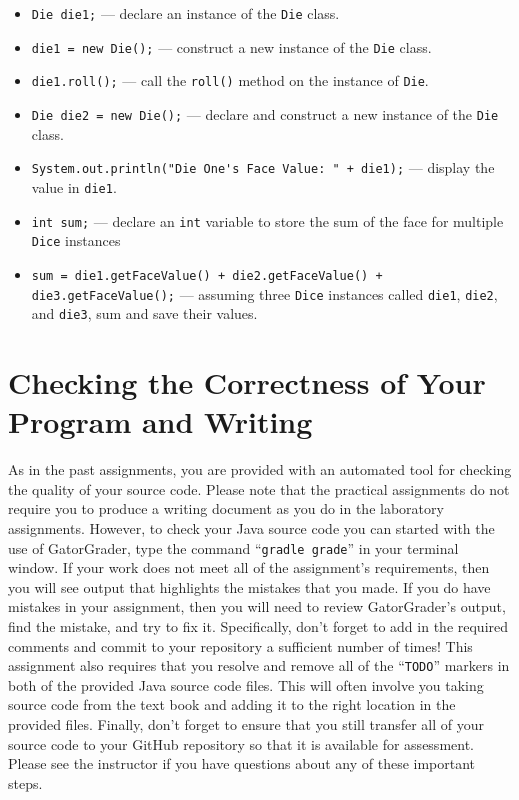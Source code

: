 \documentclass[11pt]{article}
\newcommand{\gatorgraderstart}{\command{gradle grade}}
\newcommand{\command}[1]{``\lstinline{#1}''}
\newcommand{\program}[1]{\lstinline{#1}}
\begin{document}
\begin{itemize}

  \item \program{Die die1;} --- declare an instance of the \program{Die} class.

  \item \program{die1 = new Die();} --- construct a new instance of the \program{Die} class.

  \item \program{die1.roll();} --- call the \program{roll()} method on the
    instance of \program{Die}.

  \item \program{Die die2 = new Die();} --- declare and construct a new instance of the \program{Die} class.

  \item \program{System.out.println("Die One's Face Value: " + die1);} ---
    display the value in \program{die1}.

  \item \program{int sum;} --- declare an \program{int} variable to store the
    sum of the face for multiple \program{Dice} instances

  \item \program{sum = die1.getFaceValue() + die2.getFaceValue() +
    die3.getFaceValue();} --- \newline assuming three \program{Dice} instances
    called \program{die1}, \program{die2}, and \program{die3}, sum and save
    their values.

\end{itemize}

\section*{Checking the Correctness of Your Program and Writing}

As in the past assignments, you are provided with an automated tool for checking
the quality of your source code. Please note that the practical assignments do
not require you to produce a writing document as you do in the laboratory
assignments. However, to check your Java source code you can started with the
use of GatorGrader, type the command \gatorgraderstart{} in your terminal
window. If your work does not meet all of the assignment's requirements, then
you will see output that highlights the mistakes that you made. If you do have
mistakes in your assignment, then you will need to review GatorGrader's output,
find the mistake, and try to fix it. Specifically, don't forget to add in the
required comments and commit to your repository a sufficient number of times!
This assignment also requires that you resolve and remove all of the
\command{TODO} markers in both of the provided Java source code files. This will
often involve you taking source code from the text book and adding it to the
right location in the provided files. Finally, don't forget to ensure that you
still transfer all of your source code to your GitHub repository so that it is
available for assessment. Please see the instructor if you have questions about
any of these important steps.
\end{document}
